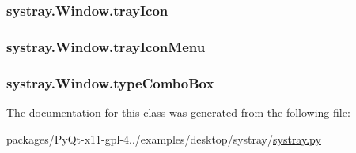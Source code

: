 \subsubsection[{tray\+Icon}]{\setlength{\rightskip}{0pt plus 5cm}systray.\+Window.\+tray\+Icon}\label{classsystray_1_1Window_a63b96ef2dab76784e3ca32b5ae3f5735}
\hypertarget{classsystray_1_1Window_afd26bcb87401fc9bc9dd57ff252d18d8}{}
\subsubsection[{tray\+Icon\+Menu}]{\setlength{\rightskip}{0pt plus 5cm}systray.\+Window.\+tray\+Icon\+Menu}\label{classsystray_1_1Window_afd26bcb87401fc9bc9dd57ff252d18d8}
\hypertarget{classsystray_1_1Window_acc25f2804bb667cc298d8bd79ecf11f4}{}
\subsubsection[{type\+Combo\+Box}]{\setlength{\rightskip}{0pt plus 5cm}systray.\+Window.\+type\+Combo\+Box}\label{classsystray_1_1Window_acc25f2804bb667cc298d8bd79ecf11f4}


The documentation for this class was generated from the following file\+:\begin{DoxyCompactItemize}
\item 
packages/\+Py\+Qt-\/x11-\/gpl-\/4../examples/desktop/systray/\hyperlink{systray_8py}{systray.\+py}\end{DoxyCompactItemize}
